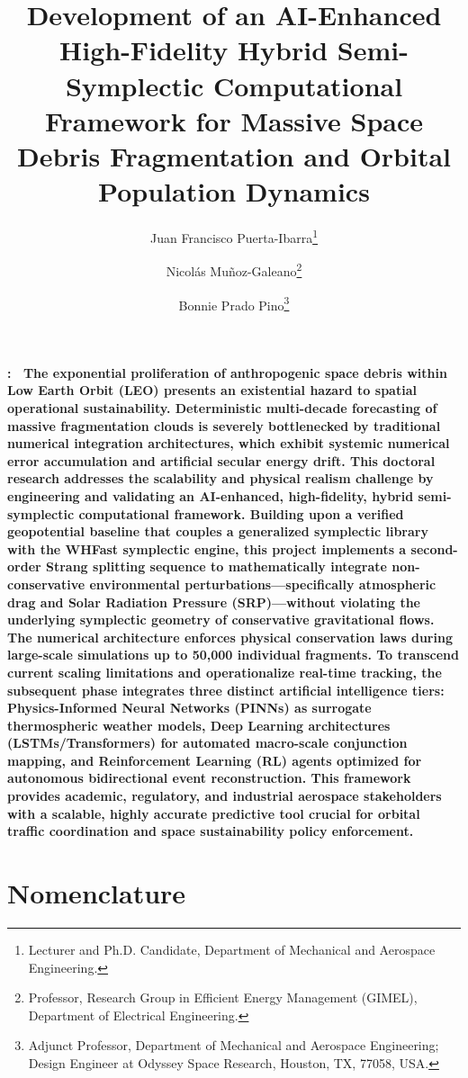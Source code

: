 \documentclass[11pt,letterpaper]{article}
\title{\textbf{Development of an AI-Enhanced High-Fidelity Hybrid Semi-Symplectic Computational Framework for Massive Space Debris Fragmentation and Orbital Population Dynamics}}
\author{Juan Francisco Puerta-Ibarra\thanks{Lecturer and Ph.D. Candidate, Department of Mechanical and Aerospace Engineering.}}
\author{Nicolás Muñoz-Galeano\thanks{Professor, Research Group in Efficient Energy Management (GIMEL), Department of Electrical Engineering.}}
\author{Bonnie Prado Pino\thanks{Adjunct Professor, Department of Mechanical and Aerospace Engineering; Design Engineer at Odyssey Space Research, Houston, TX, 77058, USA.}}
\affil{Universidad de Antioquia, Medellín, Antioquia, 050010, Colombia}
\date{}
\renewenvironment{abstract}
 {\small\quotation\bfseries\noindent\abstractname:\ }
 {\endquotation}
\begin{document}
\maketitle

\begin{abstract}
The exponential proliferation of anthropogenic space debris within Low Earth Orbit (LEO) presents an existential hazard to spatial operational sustainability. Deterministic multi-decade forecasting of massive fragmentation clouds is severely bottlenecked by traditional numerical integration architectures, which exhibit systemic numerical error accumulation and artificial secular energy drift. This doctoral research addresses the scalability and physical realism challenge by engineering and validating an AI-enhanced, high-fidelity, hybrid semi-symplectic computational framework\cite{rein_rebound_2012}. Building upon a verified geopotential baseline that couples a generalized symplectic library with the WHFast symplectic engine, this project implements a second-order Strang splitting sequence to mathematically integrate non-conservative environmental perturbations---specifically atmospheric drag and Solar Radiation Pressure (SRP)---without violating the underlying symplectic geometry of conservative gravitational flows. The numerical architecture enforces physical conservation laws during large-scale simulations up to 50,000 individual fragments\cite{tamayo_reboundx_2020}. To transcend current scaling limitations and operationalize real-time tracking, the subsequent phase integrates three distinct artificial intelligence tiers: Physics-Informed Neural Networks (PINNs) as surrogate thermospheric weather models, Deep Learning architectures (LSTMs/Transformers) for automated macro-scale conjunction mapping, and Reinforcement Learning (RL) agents optimized for autonomous bidirectional event reconstruction. This framework provides academic, regulatory, and industrial aerospace stakeholders with a scalable, highly accurate predictive tool crucial for orbital traffic coordination and space sustainability policy enforcement.
\end{abstract}

\section*{Nomenclature}
\end{document}
